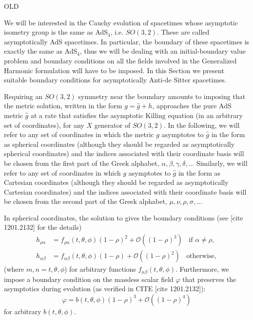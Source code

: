 \documentclass[12pt]{iopart} %
\begin{document}
OLD

We will be interested in the Cauchy evolution of spacetimes whose asymptotic isometry group is the same as AdS$_4$, i.e. $SO(3,2)$. These are called asymptotically AdS spacetimes. In particular, the boundary of these spacetimes is exactly the same as AdS$_4$, thus we will be dealing with an initial-boundary value problem and boundary conditions on all the fields involved in the Generalized Harmonic formulation will have to be imposed.
In this Section we present suitable boundary conditions for asymptotically Anti-de Sitter spacetimes.

Requiring an $SO(3,2)$ symmetry near the boundary amounts to imposing that the metric solution, written in the form $g=\hat{g}+h$, approaches the pure AdS metric $\hat{g}$ at a rate that satisfies the asymptotic Killing equation (in an arbitrary set of coordinates), 
for any $X$ generator of $SO(3,2)$. 
In the following, we will refer to any set of coordinates in which the metric $g$ asymptotes to $\hat{g}$ in the form  as spherical coordinates (although they should be regarded as asymptotically spherical coordinates) and the indices associated with their coordinate basis will be chosen from the first part of the Greek alphabet, $\alpha,\beta,\gamma,\delta,\dots$
Similarly, we will refer to any set of coordinates in which $g$ asymptotes to $\hat{g}$ in the form  as Cartesian coordinates (although they should be regarded as asymptotically Cartesian coordinates) and the indices associated with their coordinate basis will be chosen from the second part of the Greek alphabet, $\mu,\nu,\rho,\sigma,\dots$

In spherical coordinates, the solution to  gives the boundary conditions (see [cite 1201.2132] for the details)
\begin{eqnarray}
\label{eq:sphbounconh}
h_{\rho\alpha}&=f_{\rho\alpha}(t,\theta,\phi)(1-\rho)^2+\mathcal{O}((1-\rho)^3) \;\; \textrm{ if $\alpha\neq\rho$}, \\ \nonumber
h_{\alpha\beta}&=f_{\alpha\beta}(t,\theta,\phi)(1-\rho)+\mathcal{O}((1-\rho)^{2}) \;\; \textrm{ otherwise},
\end{eqnarray}
(where $m,n=t,\theta,\phi$) for arbitrary functions $f_{\alpha\beta}(t,\theta,\phi)$. Furthermore, we impose a boundary condition on the massless scalar field $\varphi$ that preserves the asymptotics  during evolution (as verified in CITE [cite 1201.2132]):
\begin{equation}\label{eq:sphbounconphi}
\varphi=b(t,\theta,\phi)(1-\rho)^3+\mathcal{O}((1-\rho)^4)
\end{equation}
for arbitrary $b(t,\theta,\phi)$.
\end{document}
